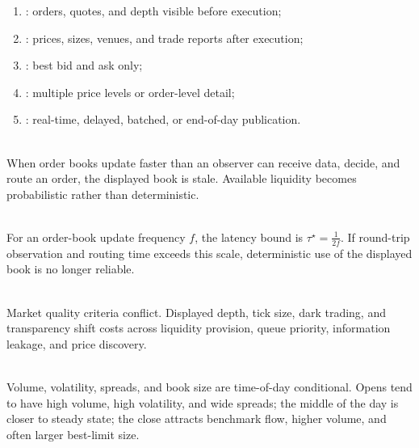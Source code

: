 \begin{taxonomy} 
\begin{enumerate}[label=\roman*.]
\setlength{\itemsep}{0pt}
\item {}: orders, quotes, and depth visible before execution;
\item {}: prices, sizes, venues, and trade reports after execution;
\item {}: best bid and ask only;
\item {}: multiple price levels or order-level detail;
\item {}: real-time, delayed, batched, or end-of-day publication.
\end{enumerate}
\end{taxonomy}

\begin{caveat} \\
When order books update faster than an observer can receive data, decide, and route an order, the displayed book is stale. Available liquidity becomes probabilistic rather than deterministic.
\end{caveat}

\begin{definition} \\
For an order-book update frequency $f$, the latency bound is $\tau^\star=\frac{1}{2f}$. If round-trip observation and routing time exceeds this scale, deterministic use of the displayed book is no longer reliable.
\end{definition}

\begin{caveat} \\
Market quality criteria conflict. Displayed depth, tick size, dark trading, and transparency shift costs across liquidity provision, queue priority, information leakage, and price discovery.
\end{caveat}

\begin{empiricalfinding} \\
Volume, volatility, spreads, and book size are time-of-day conditional. Opens tend to have high volume, high volatility, and wide spreads; the middle of the day is closer to steady state; the close attracts benchmark flow, higher volume, and often larger best-limit size.
\end{empiricalfinding}


